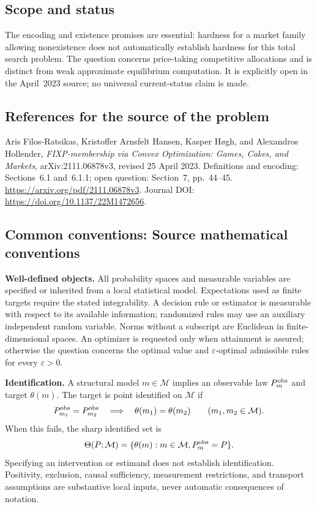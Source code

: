 \documentclass[11pt,a4paper]{article}
\begin{document}
\subsection*{Scope and status}
The encoding and existence promises are essential: hardness for a market family allowing nonexistence does not automatically establish hardness for this total search problem. The question concerns price-taking competitive allocations and is distinct from weak approximate equilibrium computation. It is explicitly open in the April~2023 source; no universal current-status claim is made.
\subsection*{References for the source of the problem}
Aris Filos-Ratsikas, Kristoffer Arnsfelt Hansen, Kasper H\o gh, and Alexandros Hollender, \emph{FIXP-membership via Convex Optimization: Games, Cakes, and Markets}, arXiv:2111.06878v3, revised 25 April 2023. Definitions and encoding: Sections~6.1 and~6.1.1; open question: Section~7, pp.~44--45. \url{https://arxiv.org/pdf/2111.06878v3}. Journal DOI: \url{https://doi.org/10.1137/22M1472656}.

\subsection*{Common conventions: Source mathematical conventions}

\textbf{Well-defined objects.}
All probability spaces and measurable variables are specified or inherited
from a local statistical model. Expectations used as finite targets require
the stated integrability. A decision rule or estimator is measurable with
respect to its available information; randomized rules may use an auxiliary
independent random variable. Norms without a subscript are Euclidean in
finite-dimensional spaces. An optimizer is requested only when attainment
is assured; otherwise the question concerns the optimal value and
$\varepsilon$-optimal admissible rules for every $\varepsilon>0$.

\textbf{Identification.}
A structural model $m\in\mathcal M$ implies an observable law
$P_m^{\rm obs}$ and target $\theta(m)$. The target is point identified on
$\mathcal M$ if
\[
 P_{m_1}^{\rm obs}=P_{m_2}^{\rm obs}
 \quad\Longrightarrow\quad\theta(m_1)=\theta(m_2)
 \qquad(m_1,m_2\in\mathcal M).
\]
When this fails, the sharp identified set is
\[
 \Theta(P;\mathcal M)=\{\theta(m):m\in\mathcal M,
                                  P_m^{\rm obs}=P\}.
\]
Specifying an intervention or estimand does not establish identification.
Positivity, exclusion, causal sufficiency, measurement restrictions, and
transport assumptions are substantive local inputs, never automatic
consequences of notation.
\end{document}
